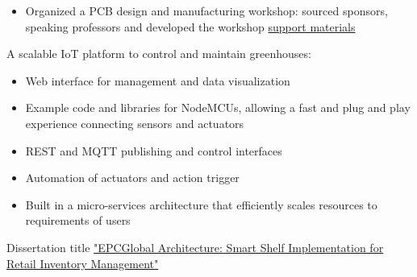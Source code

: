 \documentclass[10pt,a4paper,ragged2e,withhyper]{altacv}
\begin{document}
\begin{paracol}{2}
\divider

\begin{itemize}
  \item Organized a PCB design and manufacturing workshop: sourced sponsors, speaking professors and developed the workshop \href{https://github.com/dvcorreia/ac2-detpic-pcb-shield}{support materials}
\end{itemize}

\pagebreak
{}

A scalable IoT platform to control and maintain greenhouses:
\begin{itemize}
\item Web interface for management and data visualization
\item Example code and libraries for NodeMCUs, allowing a fast and plug and play experience connecting sensors and actuators
\item REST and MQTT publishing and control interfaces
\item Automation of actuators and action trigger
\item Built in a micro-services architecture that efficiently scales resources to requirements of users
\end{itemize}

\medskip





Dissertation title \href{https://github.com/dvcorreia/epc-smart-shelve}{"EPCGlobal Architecture: Smart Shelf Implementation for Retail Inventory Management"}
\iffalse
\begin{itemize}
  \item RF survey of industrial shelves for EPC Class1 Gen2 passive tag readings
  \item Optimized RF operations, report contents and tag filtering through the LLRP protocol
  \item Architecture follows the supply-chain specifications in the EPC Global Framework
  \item Used Docker to containerize and orchestrate Fosstrak Java services
  \item Developed HTTP services (REST, websockets) using Golang
  \item Developed a web interface for inventory management with React JS
\end{itemize} 
\fi


\end{paracol}
\end{document}
